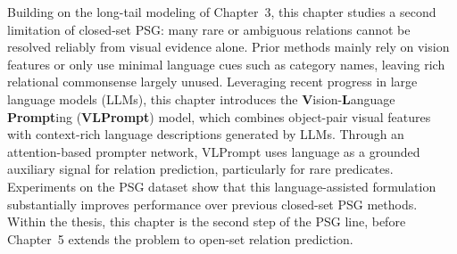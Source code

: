 Building on the long-tail modeling of Chapter~3, this chapter studies a second limitation of closed-set PSG: many rare or ambiguous relations cannot be resolved reliably from visual evidence alone.
Prior methods mainly rely on vision features or only use minimal language cues such as category names, leaving rich relational commonsense largely unused.
Leveraging recent progress in large language models (LLMs), this chapter introduces the \textbf{V}ision-\textbf{L}anguage \textbf{Prompt}ing (\textbf{VLPrompt}) model, which combines object-pair visual features with context-rich language descriptions generated by LLMs.
Through an attention-based prompter network, VLPrompt uses language as a grounded auxiliary signal for relation prediction, particularly for rare predicates.
Experiments on the PSG dataset show that this language-assisted formulation substantially improves performance over previous closed-set PSG methods.
Within the thesis, this chapter is the second step of the PSG line, before Chapter~5 extends the problem to open-set relation prediction.
